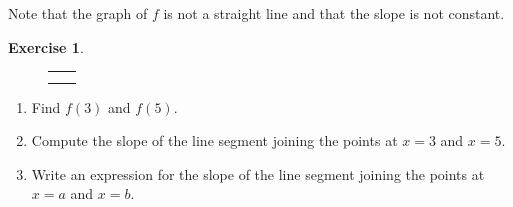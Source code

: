 \documentclass[10pt,]{book}
\theoremstyle{plain}
\theoremstyle{definition}
\theoremstyle{definition}
\theoremstyle{definition}
\theoremstyle{definition}
\newtheorem{exercise}[theorem]{Exercise}
\numberwithin{equation}{part}
\newlength{\panelmax}
\begin{document}
Note that the graph of \(f\) is not a straight line and that the slope is not constant.%
\begin{exercise}\label{exercise-slope-of-secant}
{%
\setlength{\panelmax}{0pt}
\newsavebox{\panelboxBAZp}
\newlength{\phBAZp}\setlength{\phBAZp}{\ht\panelboxBAZp+\dp\panelboxBAZp}
\settototalheight{\phBAZp}{\usebox{\panelboxBAZp}}
\setlength{\panelmax}{\maxof{\panelmax}{\phBAZp}}
\newsavebox{\panelboxEAimage}
\newlength{\phEAimage}\setlength{\phEAimage}{\ht\panelboxEAimage+\dp\panelboxEAimage}
\settototalheight{\phEAimage}{\usebox{\panelboxEAimage}}
\setlength{\panelmax}{\maxof{\panelmax}{\phEAimage}}
\leavevmode%
\setlength{\tabcolsep}{0\textwidth}
\begin{figure}
\begin{tabular}{@{}*{2}{c}@{}}
\begin{minipage}[c][\panelmax][t]{0.5\textwidth}\usebox{\panelboxBAZp}\end{minipage}&
\begin{minipage}[c][\panelmax][t]{0.5\textwidth}\usebox{\panelboxEAimage}\end{minipage}\tabularnewline
&
\parbox[t]{0.5\textwidth}{
}\end{tabular}
\end{figure}
}%
 \leavevmode%
\begin{enumerate}[label=*\alph**]
\item\hypertarget{li-903}{}Find \(f (3)\) and \(f (5)\).%
\item\hypertarget{li-904}{}Compute the slope of the line segment joining the points at \(x = 3\) and \(x = 5\).%
\item\hypertarget{li-905}{}Write an expression for the slope of the line segment joining the points at \(x = a\) and \(x = b\).%
\end{enumerate}
%
\end{exercise}
\end{document}
